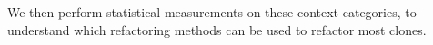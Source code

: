 We then perform statistical measurements on these context categories, to understand which refactoring methods can be used to refactor most clones. 




